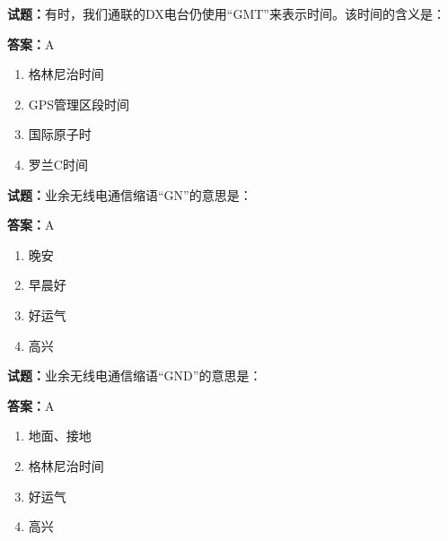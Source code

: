 \documentclass{ctexbook}
\begin{document}




\vspace{1em}

\textbf{试题：}有时，我们通联的DX电台仍使用“GMT”来表示时间。该时间的含义是： 

\textbf{答案：}A 

\begin{enumerate}[leftmargin=3em]
  \item 格林尼治时间 

  \item GPS管理区段时间 

  \item 国际原子时 

  \item 罗兰C时间 

\end{enumerate}





\vspace{1em}

\textbf{试题：}业余无线电通信缩语“GN”的意思是： 

\textbf{答案：}A 

\begin{enumerate}[leftmargin=3em]
  \item 晚安 

  \item 早晨好 

  \item 好运气 

  \item 高兴 

\end{enumerate}





\vspace{1em}

\textbf{试题：}业余无线电通信缩语“GND”的意思是： 

\textbf{答案：}A 

\begin{enumerate}[leftmargin=3em]
  \item 地面、接地 

  \item 格林尼治时间 

  \item 好运气 

  \item 高兴 

\end{enumerate}
\end{document}
